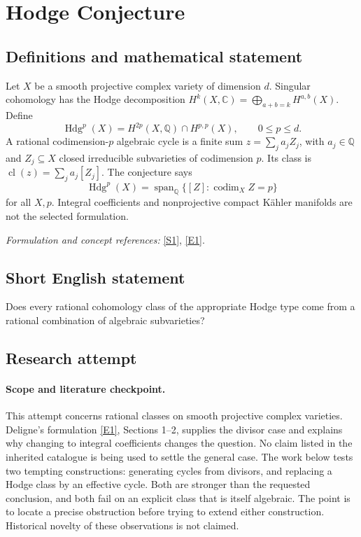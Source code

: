 \documentclass[11pt]{article}
\begin{document}
\section*{\texorpdfstring{Hodge Conjecture}{Hodge Conjecture}}\label{4}
\subsection{Definitions and mathematical statement}
Let $X$ be a smooth projective complex variety of dimension $d$. Singular cohomology has the Hodge decomposition $H^k(X,{\mathbb{C}})=\bigoplus_{a+b=k}H^{a,b}(X)$. Define
\[
 \operatorname{Hdg}^{p}(X)=H^{2p}(X,{\mathbb{Q}})\cap H^{p,p}(X),\qquad 0\le p\le d.
\]
A rational codimension-$p$ algebraic cycle is a finite sum $z=\sum_j a_j Z_j$, with $a_j\in{\mathbb{Q}}$ and $Z_j\subseteq X$ closed irreducible subvarieties of codimension $p$. Its class is $\operatorname{cl}(z)=\sum_j a_j[Z_j]$. The conjecture says
\[
 \operatorname{Hdg}^{p}(X)=\operatorname{span}_{{\mathbb{Q}}}\{[Z]:\operatorname{codim}_X Z=p\}
\]
for all $X,p$. Integral coefficients and nonprojective compact Kähler manifolds are not the selected formulation.
\par\smallskip\textit{Formulation and concept references:} \href{https://www.claymath.org/library/monographs/MPPc.pdf}{[S1]}, \href{https://www.claymath.org/wp-content/uploads/2022/06/hodge.pdf}{[E1]}.

\subsection{Short English statement}
Does every rational cohomology class of the appropriate Hodge type come from a rational combination of algebraic subvarieties?
\subsection{Research attempt}

\paragraph{Scope and literature checkpoint.}
This attempt concerns rational classes on smooth projective complex varieties.
Deligne's formulation \href{https://www.claymath.org/wp-content/uploads/2022/06/hodge.pdf}{[E1]}, Sections 1--2, supplies the divisor case and
explains why changing to integral coefficients changes the question. No claim
listed in the inherited catalogue is being used to settle the general case.
The work below tests two tempting constructions: generating cycles from
divisors, and replacing a Hodge class by an effective cycle. Both are stronger
than the requested conclusion, and both fail on an explicit class that is
itself algebraic. The point is to locate a precise obstruction before trying
to extend either construction. Historical novelty of these observations is
not claimed.
\end{document}
